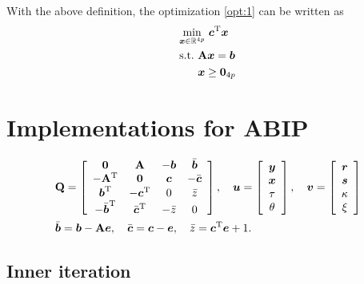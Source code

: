 With the above definition, the optimization \eqref{opt:1} can be written as
\begin{align*}
     & \underset{\boldsymbol{x}\in{\mathbb R}^{4p}}{\min}~ \boldsymbol{c}^{\rm T}\boldsymbol{x}
    \\
     & \begin{aligned}
        \text{s.t.}~ & {\bf A}\boldsymbol{x} = \boldsymbol{b}
        \\
                     & \boldsymbol{x} \geq \boldsymbol{0}_{4p}
    \end{aligned}
\end{align*}

\section{Implementations for ABIP}

\begin{align*}
    &{\bf Q} =
    \left[
        \begin{array}{cccc}
            \boldsymbol{0}              & {\bf A}             & -\boldsymbol{b}       & \bar{\boldsymbol{b}}  \\
            -{\bf A}^{\rm T}       & \boldsymbol{0}             & \boldsymbol{c}        & -\bar{\boldsymbol{c}} \\
            \boldsymbol{b}^{\rm T}        & -\boldsymbol{c}^{\rm T}      & 0        & \bar{z}  \\
            -\bar{\boldsymbol{b}}^{\rm T} & \bar{\boldsymbol{c}}^{\rm T} & -\bar{z} & 0
        \end{array}
        \right],
    \quad
    \boldsymbol{u} = \left[
        \begin{array}{c}
            \boldsymbol{y}   \\
            \boldsymbol{x}   \\
            \tau \\
            \theta
        \end{array}
        \right],
    \quad
    \boldsymbol{v} = \left[
        \begin{array}{c}
            \boldsymbol{r}     \\
            \boldsymbol{s}     \\
            \kappa \\
            \xi
        \end{array}
        \right] 
        \\
        &\bar{\boldsymbol{b}} = \boldsymbol{b} - {\bf A}\boldsymbol{e}, \quad 
        \bar{\boldsymbol{c}} = \boldsymbol{c} - \boldsymbol{e}, \quad 
        \bar{z} = \boldsymbol{c}^{\rm T}\boldsymbol{e} + 1.
\end{align*}

\subsection{Inner iteration} 

